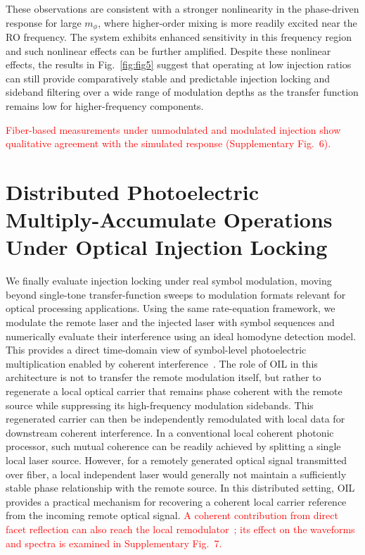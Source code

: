 \documentclass[%
 aip,
 apl,
 amsmath,amssymb,
 reprint,%
 floatfix,
]{revtex4-1}
\begin{document}
These observations are consistent with a stronger nonlinearity in the phase-driven response for large $m_\phi$, where higher-order mixing is more readily excited near the RO frequency. The system exhibits enhanced sensitivity in this frequency region and such nonlinear effects can be further amplified. Despite these nonlinear effects, the results in Fig.~\ref{fig:fig5} suggest that operating at low injection ratios can still provide comparatively stable and predictable injection locking and sideband filtering over a wide range of modulation depths as the transfer function remains low for higher-frequency components.

\textcolor{red}{Fiber-based measurements under unmodulated and modulated injection show qualitative agreement with the simulated response (Supplementary Fig.~6).}


\section{Distributed Photoelectric Multiply-Accumulate Operations Under Optical Injection Locking}

We finally evaluate injection locking under real symbol modulation, moving beyond single-tone transfer-function sweeps to modulation formats relevant for optical processing applications. Using the same rate-equation framework, we modulate the remote laser and the injected laser with symbol sequences and numerically evaluate their interference using an ideal homodyne detection model. This provides a direct time-domain view of symbol-level photoelectric multiplication enabled by coherent interference~\cite{RahimiKari2024Optica_CoherentPlatform,Hamerly2019PRX_PhotoelectricMultiplication,Chen2023NatPhoton_VCSEL,Zhou2025_QA_PhotonicHomodyne}. The role of OIL in this architecture is not to transfer the remote modulation itself, but rather to regenerate a local optical carrier that remains phase coherent with the remote source while suppressing its high-frequency modulation sidebands. This regenerated carrier can then be independently remodulated with local data for downstream coherent interference. In a conventional local coherent photonic processor, such mutual coherence can be readily achieved by splitting a single local laser source. However, for a remotely generated optical signal transmitted over fiber, a local independent laser would generally not maintain a sufficiently stable phase relationship with the remote source. In this distributed setting, OIL provides a practical mechanism for recovering a coherent local carrier reference from the incoming remote optical signal.
\textcolor{red}{A coherent contribution from direct facet reflection can also reach the local remodulator~\cite{LiuSlavik2020OILTutorial}; its effect on the waveforms and spectra is examined in Supplementary Fig.~7.}
\end{document}
